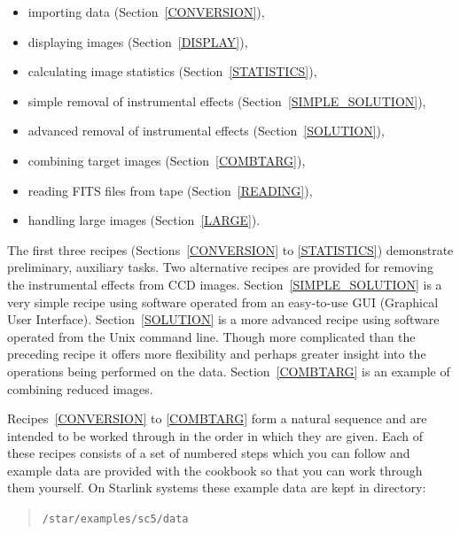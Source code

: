 \documentclass[twoside,11pt]{article}
\begin{document}
\begin{itemize}

  \item importing data (Section~\ref{CONVERSION}),

  \item displaying images (Section~\ref{DISPLAY}),

  \item calculating image statistics (Section~\ref{STATISTICS}),

  \item simple removal of instrumental effects
   (Section~\ref{SIMPLE_SOLUTION}),

  \item advanced removal of instrumental effects (Section~\ref{SOLUTION}),

  \item combining target images (Section~\ref{COMBTARG}),

  \item reading FITS files from tape (Section~\ref{READING}),

  \item handling large images (Section~\ref{LARGE}).

\end{itemize}

The first three recipes (Sections~\ref{CONVERSION} to \ref{STATISTICS})
demonstrate preliminary, auxiliary tasks.  Two alternative recipes are
provided for removing the instrumental effects from CCD images.
Section~\ref{SIMPLE_SOLUTION} is a very simple recipe using software
operated from an easy-to-use GUI (Graphical User Interface).
Section~\ref{SOLUTION} is a more advanced recipe using software operated
from the Unix command line.  Though more complicated than the preceding
recipe it offers more flexibility and perhaps greater insight into the
operations being performed on the data.  Section~\ref{COMBTARG} is an
example of combining reduced images.

Recipes~\ref{CONVERSION} to \ref{COMBTARG} form a natural sequence and are
intended to be worked through in the order in which they are given.  Each
of these recipes consists of a set of numbered steps which you can follow
and example data are provided with the cookbook so that you can work through
them yourself.  On Starlink systems these example data are kept in directory:

\begin{quote}
{\tt /star/examples/sc5/data}
\end{quote}
\end{document}
